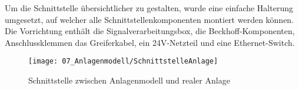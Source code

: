 		Um die Schnittstelle übersichtlicher zu gestalten, wurde eine einfache Halterung umgesetzt, auf welcher alle Schnittstellenkomponenten montiert werden können. Die Vorrichtung enthält die Signalverarbeitungsbox, die Beckhoff-Komponenten, Anschlussklemmen das Greiferkabel, ein 24V-Netzteil und eine Ethernet-Switch. 
		
		\begin{figure}[H]
			\centering
			\texttt{[image: 07\_Anlagenmodell/SchnittstelleAnlage]}
			\captionsetup{justification=centering}
			\caption{Schnittstelle zwischen Anlagenmodell und realer Anlage}
			\label{fig:SchnittstelleAnlage}
		\end{figure}
		
		
		